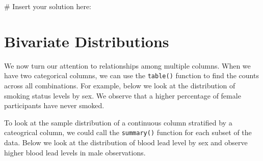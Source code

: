 \documentclass[
  letterpaper,
]{krantz}
\makeatletter
\newenvironment{Shaded}{\begin{snugshade}}{\end{snugshade}}
\newcommand{\CommentTok}[1]{\textcolor[rgb]{0.37,0.37,0.37}{#1}}
\newcommand{\FunctionTok}[1]{\textcolor[rgb]{0.28,0.35,0.67}{#1}}
\newcommand{\NormalTok}[1]{\textcolor[rgb]{0.00,0.23,0.31}{#1}}
\newcommand{\SpecialCharTok}[1]{\textcolor[rgb]{0.37,0.37,0.37}{#1}}
\newcommand{\StringTok}[1]{\textcolor[rgb]{0.13,0.47,0.30}{#1}}
\newenvironment{kframe}{%
\medskip{}
\setlength{\fboxsep}{.8em}
 \def\at@end@of@kframe{}%
 \ifinner\ifhmode%
  \def\at@end@of@kframe{\end{minipage}}%
  \begin{minipage}{\columnwidth}%
 \fi\fi%
 \def\FrameCommand##1{\hskip\@totalleftmargin \hskip-\fboxsep
 \colorbox{shadecolor}{##1}\hskip-\fboxsep
     \hskip-\linewidth \hskip-\@totalleftmargin \hskip\columnwidth}%
 \MakeFramed {\advance\hsize-\width
   \@totalleftmargin\z@ \linewidth\hsize
   \@setminipage}}%
 {\par\unskip\endMakeFramed%
 \at@end@of@kframe}
\renewenvironment{Shaded}{\begin{kframe}}{\end{kframe}}
\makeatother
\begin{document}
\begin{Shaded}
\begin{Highlighting}[]
\CommentTok{\# Insert your solution here:}
\end{Highlighting}
\end{Shaded}

\hypertarget{bivariate-distributions}{%
\section{Bivariate Distributions}\label{bivariate-distributions}}

We now turn our attention to relationships among multiple columns. When
we have two categorical columns, we can use the \texttt{table()}
function to find the counts across all combinations. For example, below
we look at the distribution of smoking status levels by sex. We observe
that a higher percentage of female participants have never smoked.

\begin{Shaded}
\end{Shaded}

To look at the sample distribution of a continuous column stratified by
a cateogrical column, we could call the \texttt{summary()} function for
each subset of the data. Below we look at the distribution of blood lead
level by sex and observe higher blood lead levels in male observations.

\begin{Shaded}
\end{Shaded}
\end{document}
